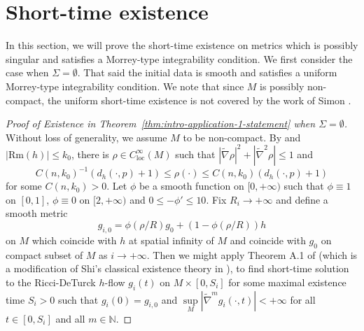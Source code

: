 \documentclass[12pt]{amsart}
\theoremstyle{plain}
\theoremstyle{plain}
\theoremstyle{definition}
\theoremstyle{remark}
\numberwithin{equation}{subsection}
\newcommand{\hdel}{\tilde{\nabla}}
\begin{document}
\section{Short-time existence}\label{sec:proof-of-main-theorem}
In this section, we will prove the short-time existence on metrics which is possibly singular and satisfies a Morrey-type integrability condition. We first consider the case when $\Sigma=\emptyset$. That said the initial data is smooth and satisfies a uniform Morrey-type integrability condition. We note that since $M$ is possibly non-compact, the uniform short-time existence is not covered by the work of Simon \cite{simon_deformation_2002}.
\begin{proof}[Proof of Existence in  Theorem~\ref{thm:intro-application-1-statement} when $\Sigma=\emptyset$]

Without loss of generality, we assume $M$ to be non-compact. By \cite{tam_exhaustion_2010} and $|\text{Rm}(h)|\leq k_0$, there is $\rho \in C^\infty_\text{loc}(M)$ such that $|\hdel \rho|^2 + |\hdel^2 \rho| \leq 1$ and
    \begin{equation*}
        C(n,k_0)^{-1}(d_h(\cdot, p)+1)\leq \rho(\cdot) \leq  C(n,k_0)(d_h(\cdot,p) + 1)
    \end{equation*}
    for some $ C(n,k_0)>0$. Let $\phi$ be a smooth function on $[0,+\infty)$ such that $\phi \equiv 1$ on $[0,1]$, $\phi \equiv 0$ on $[2,+\infty)$ and $0\leq-\phi'\leq 10$. Fix $R_i\to+\infty$ and define a smooth metric 
    $$g_{i,0}=\phi(\rho/R)g_0+(1-\phi(\rho/R)) h$$
on $M$ which coincide with $h$ at spatial infinity of $M$ and coincide with $g_0$ on compact subset of $M$ as $i\to+\infty$. Then we might apply Theorem A.1 of \cite{lamm_ricci_2021} (which is a modification of Shi's classical existence theory in \cite{shi_deforming_1989}), to find  short-time solution to the Ricci-DeTurck $h$-flow $g_i(t)$ on $M \times [0,S_i]$ for some maximal existence time $S_i > 0$ such that $g_i(0) = g_{i,0}$ and $\sup\limits_M |\hdel^m g_i(\cdot, t)|<+\infty$ for all $t \in [0, S_i]$ and all $m\in \mathbb{N}$. %


\end{proof}
\end{document}
